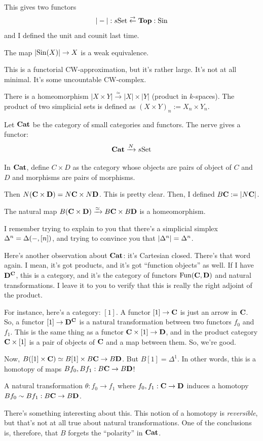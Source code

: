 This gives two functors
$$
|-|:s\mathrm{Set}\stackrel{\rightarrow}{\leftarrow} \mathbf{Top}:\mathrm{Sin}
$$
and I defined the unit and counit last time.
\begin{theorem}[Milnor]
    The map $|\mathrm{Sin}(X)|\to X$ is a weak equivalence.
\end{theorem}
This is a functorial CW-approximation, but it's rather large.
It's not at all minimal.
It's some uncountable CW-complex.
\begin{theorem}
    There is a homeomorphism $|X\times Y|\xrightarrow{\simeq} |X|\times |Y|$ (product in $k$-spaces).
    The product of two simplicial sets is defined as $(X\times Y)_n:=X_n\times Y_n$.
\end{theorem}
Let $\mathbf{Cat}$ be the category of small categories and functors. The nerve gives a functor:
$$
\mathbf{Cat}\xrightarrow{N}s\mathrm{Set}
$$
\begin{definition}
    In $\mathbf{Cat}$, define $C\times D$ as the category whose objects are pairs of object of $C$ and $D$ and morphisms are pairs of morphisms.
\end{definition}
Then $N(\mathbf C\times\mathbf D) = N\mathbf C\times N\mathbf D$.
This is pretty clear.
Then, I defined $B\mathbf C:=|N\mathbf C|$.
\begin{theorem}
    The natural map $B(\mathbf C\times\mathbf D)\xrightarrow{\simeq}B\mathbf C\times B\mathbf D$ is a homeomorphism.
\end{theorem}
I remember trying to explain to you that there's a simplicial simplex ${\Delta}^n = {\Delta}(-,[n])$, and trying to convince you that $|{\Delta}^n| = \Delta^n$.

Here's another observation about $\mathbf{Cat}$: it's Cartesian closed. There's that word again. I mean, it's got products, and it's got ``function objects'' as well.
If I have $\mathbf D^\mathbf C$, this is a category, and it's the category of functors $\operatorname{Fun}(\mathbf C,\mathbf D)$ and natural transformations.
I leave it to you to verify that this is really the right adjoint of the product.

For instance, here's a category: $[1]$. A functor $[1]\to\mathbf C$ is just an arrow in $\mathbf C$.
So, a functor $[1]\to\mathbf D^\mathbf C$ is a natural transformation between two functors $f_0$ and $f_1$.
This is the same thing as a functor $\mathbf C\times[1]\to\mathbf D$, and in the product category $\mathbf C\times[1]$ is a pair of objects of $\mathbf C$ and a map between them.
So, we're good.

Now, $B([1]\times \mathbf C)\simeq B[1]\times B\mathbf C\to B\mathbf D$. But $B[1] = \Delta^1$.
In other words, this is a homotopy of maps $Bf_0,Bf_1:B\mathbf C\to B\mathbf D$!
\begin{lemma}
    A natural transformation $\theta:f_0\to f_1$ where $f_0,f_1:\mathbf C\to\mathbf D$ induces a homotopy $Bf_0\sim Bf_1:B\mathbf C\to B\mathbf D$.
\end{lemma}
There's something interesting about this.
This notion of a homotopy is \emph{reversible}, but that's not at all true about natural transformations.
One of the conclusions is, therefore, that $B$ forgets the ``polarity'' in $\mathbf{Cat}$.

